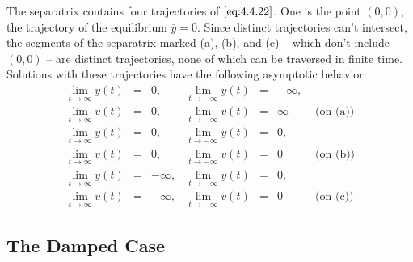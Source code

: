 \documentclass{ximera}
\begin{document}
\begin{example}
The separatrix contains four trajectories of $\eqref{eq:4.4.22}$. One is the
point $(0,0)$, the trajectory of the equilibrium $\overline{y}=0$.
Since distinct trajectories can't intersect, the segments of the
separatrix marked (a), (b), and (c) -- which don't include $(0,0)$ --
are distinct trajectories, none of which can be traversed in finite
time. Solutions with these trajectories have the following asymptotic
behavior:
$$
\begin{array}{llrllrl}
\lim_{t\rightarrow\infty}y(t)&=&0, &\lim_{t\rightarrow-\infty}y(t)&=&-\infty,\\
\lim_{t\rightarrow\infty}v(t)&=&0,
&\lim_{t\rightarrow-\infty}v(t)&=&\infty&
\mbox{ (on (a))}  \\
\lim_{t\rightarrow\infty}y(t)&=&0, &\lim_{t\rightarrow-\infty}y(t)&=&0,\\
\lim_{t\rightarrow\infty}v(t)&=&0,
&\lim_{t\rightarrow-\infty}v(t)&=&0&
\mbox{ (on (b))}  \\
\lim_{t\rightarrow\infty}y(t)&=&-\infty, &\lim_{t\rightarrow-\infty}y(t)&=&0,\\
\lim_{t\rightarrow\infty}v(t)&=&-\infty,
&\lim_{t\rightarrow-\infty}v(t)&=&0&
\mbox{ (on (c))}
\end{array}
$$
\end{example}
 
 
\subsection*{The Damped Case}
 
\end{document}
